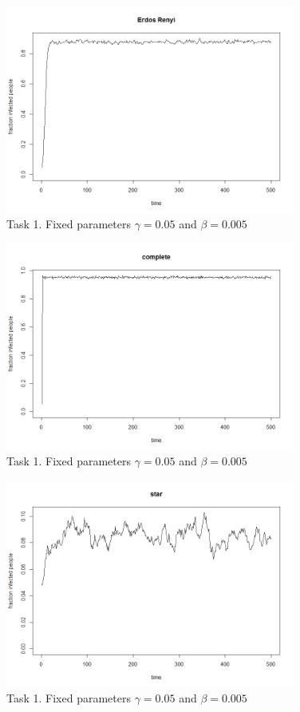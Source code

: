 \documentclass[paper=a4, fontsize=11pt]{scrartcl} %
\begin{document}
\begin{figure}[!h] %
   \centering
   \includegraphics[width=0.85\textwidth]{task1_erdosrenyi} 
\caption{Task 1. Fixed parameters $\gamma=0.05$ and $\beta=0.005$}
   \label{task1_erdosrenyi}
\end{figure}
\begin{figure}[!h] %
   \centering
   \includegraphics[width=0.85\textwidth]{task1_complete} 
\caption{Task 1. Fixed parameters $\gamma=0.05$ and $\beta=0.005$}
   \label{task1_complete}
\end{figure}
\begin{figure}[!h] %
   \centering
   \includegraphics[width=0.85\textwidth]{task1_star} 
\caption{Task 1. Fixed parameters $\gamma=0.05$ and $\beta=0.005$}
   \label{task1_star}
\end{figure}
\end{document}
